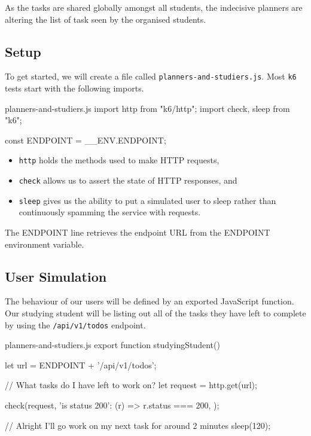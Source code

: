\documentclass{csse4400}
\begin{document}
As the tasks are shared globally amongst all students,
the indecisive planners are altering the list of task seen by the organised students.

\subsection{Setup}
To get started,
we will create a file called \texttt{planners-and-studiers.js}.
Most \texttt{k6} tests start with the following imports.
%
\begin{code}[language=JavaScript,numbers=none]{planners-and-studiers.js}
import http from "k6/http";
import { check, sleep } from "k6";

const ENDPOINT = __ENV.ENDPOINT;
\end{code}

\begin{itemize}
    \item \texttt{http} holds the methods used to make HTTP requests,
    \item \texttt{check} allows us to assert the state of HTTP responses, and
    \item \texttt{sleep} gives us the ability to put a simulated user to sleep rather than continuously spamming the service with requests.
\end{itemize}

The ENDPOINT line retrieves the endpoint URL from the ENDPOINT environment variable.

\subsection{User Simulation}

The behaviour of our users will be defined by an exported JavaScript function.
Our studying student will be listing out all of the tasks they have left to complete by using the
\texttt{/api/v1/todos} endpoint.
%
\begin{code}[language=JavaScript,numbers=none]{planners-and-studiers.js}
export function studyingStudent() {
    let url = ENDPOINT + '/api/v1/todos';

    // What tasks do I have left to work on?
    let request = http.get(url);

    check(request, {
        'is status 200': (r) => r.status === 200,
    });
    
    // Alright I'll go work on my next task for around 2 minutes
    sleep(120);
}
\end{code}
\end{document}
